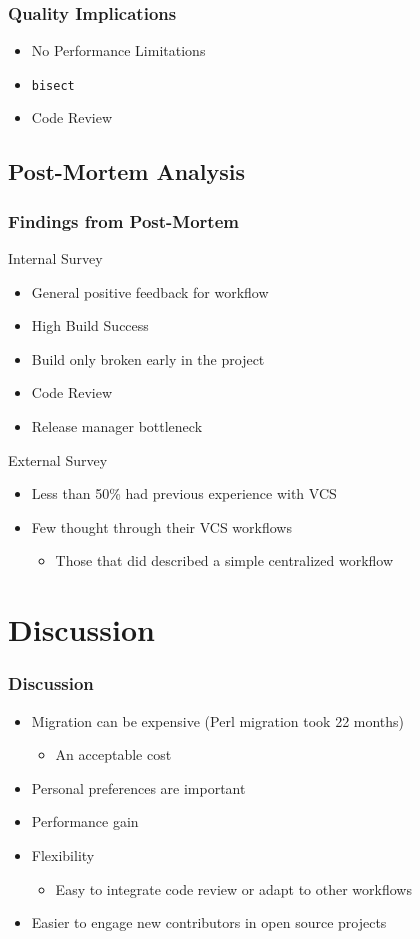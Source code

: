 \documentclass{beamer}
\begin{document}
\begin{frame}[fragile]
 \transwipe
 \frametitle{Quality Implications}
 \begin{itemize}
  \item No Performance Limitations
  \item \verb!bisect!
  \item Code Review
 \end{itemize}
\end{frame}

\subsection{Post-Mortem Analysis}
\begin{frame}
 \transwipe
 \frametitle{Findings from Post-Mortem}
 Internal Survey
 \begin{itemize}
  \item General positive feedback for workflow
  \item High Build Success
  \item Build only broken early in the project
  \item Code Review
  \item Release manager bottleneck
 \end{itemize}

 \pause

 External Survey
 \begin{itemize}
  \item Less than 50\% had previous experience with VCS
  \item Few thought through their VCS workflows
   \begin{itemize}
    \item Those that did described a simple centralized workflow
   \end{itemize}
 \end{itemize}
\end{frame}


\section{Discussion}
\begin{frame}
 \transwipe
 \frametitle{Discussion}
 \begin{itemize}
  \item Migration can be expensive (Perl migration took 22 months)
   \begin{itemize}
    \item An acceptable cost
   \end{itemize}
  \item Personal preferences are important
  \item Performance gain
  \item Flexibility
   \begin{itemize}
    \item Easy to integrate code review or adapt to other workflows
   \end{itemize}
 \item Easier to engage new contributors in open source projects
 \end{itemize}
\end{frame}
\end{document}
